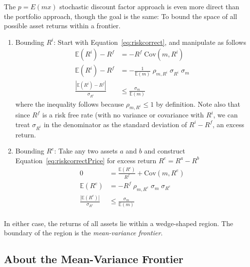 \documentclass[12pt]{article}
\theoremstyle{plain}
\theoremstyle{definition}
\theoremstyle{remark}
\begin{document}
The $p=E(mx)$ stochastic discount factor approach is even more direct
than the portfolio approach, though the goal is the same: To bound the
space of all possible asset returns within a frontier.
\begin{enumerate}
  \item Bounding $R^i$: Start with Equation~\ref{eq:riskcorrect}, and
    manipulate as follows
    \begin{align*}
      \mathbb{E}(R^i) - R^f
      &= -R^f \; \text{Cov}(m,R^i)\\
      \mathbb{E}(R^i) - R^f
      &= -\frac{1}{\mathbb{E}(m)} \; \rho_{m,R^i} \; \sigma_{R^i} \; \sigma_m\\
      \frac{\left\lvert\mathbb{E}(R^i) - R^f\right\rvert}{\sigma_{R^i}}
      &\leq \frac{\sigma_m}{\mathbb{E}(m)}
    \end{align*}
    where the inequality follows because $\rho_{m,R^i}\leq 1$ by definition.
    Note also that since $R^f$ is a risk free rate (with no variance or
    covariance with $R^i$, we can treat $\sigma_{R^i}$ in the denominator as
    the standard deviation of $R^i-R^f$, an excess return.

  \item Bounding $R^e$: Take any two assets $a$ and $b$ and construct
    Equation~\ref{eq:riskcorrectPrice} for excess return $R^e=R^a-R^b$
    \begin{align*}
      0 &= \frac{\mathbb{E}(R^e)}{R^f} + \text{Cov}(m,R^e)\\
      \mathbb{E}(R^e)
      &= -R^f \; \rho_{m,R^e} \; \sigma_m \; \sigma_{R^e}\\
      \frac{\left\lvert\mathbb{E}(R^e)\right\rvert}{\sigma_{R^e}}
      &\leq \frac{\sigma_m}{\mathbb{E}(m)} \\
    \end{align*}
\end{enumerate}
In either case, the returns of all assets lie within a wedge-shaped
region. The boundary of the region is the \emph{mean-variance frontier}.

\subsection{About the Mean-Variance Frontier}
\end{document}
